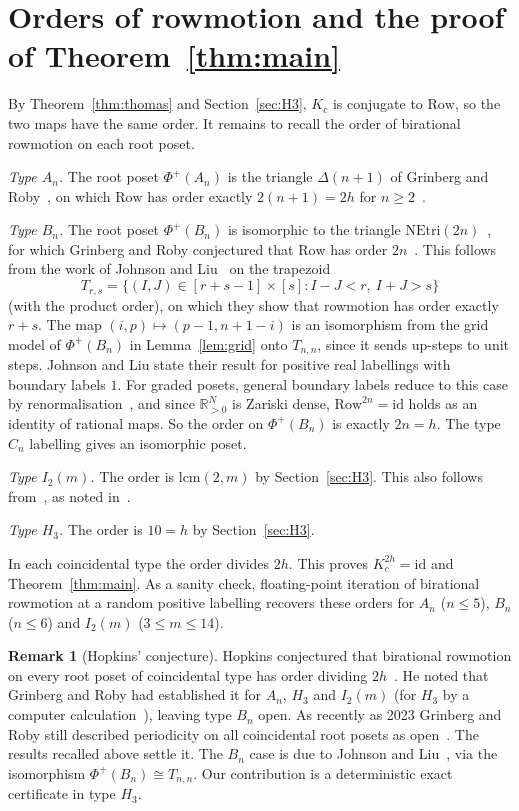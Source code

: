 \documentclass[11pt]{amsart}
\theoremstyle{definition}
\newtheorem{remark}[theorem]{Remark}
\newcommand{\Row}{\mathrm{Row}}
\begin{document}
\section{\texorpdfstring{Orders of rowmotion and the proof of Theorem~\ref{thm:main}}{Orders of rowmotion and the proof of the main theorem}}\label{sec:orders}
By Theorem~\ref{thm:thomas} and Section~\ref{sec:H3}, $K_c$ is conjugate to $\Row$, so the two maps have the same order. It remains to recall the order of birational rowmotion on each root poset.

\emph{Type $A_n$.} The root poset $\Phi^+(A_n)$ is the triangle $\Delta(n+1)$ of Grinberg and Roby~\cite[Rem.~18.3]{GR2}, on which $\Row$ has order exactly $2(n+1)=2h$ for $n\ge2$~\cite[Cor.~18.9]{GR2}.

\emph{Type $B_n$.} The root poset $\Phi^+(B_n)$ is isomorphic to the triangle $\mathrm{NEtri}(2n)$~\cite[Rem.~19.3]{GR2}, for which Grinberg and Roby conjectured that $\Row$ has order $2n$~\cite[Conj.~19.5]{GR2}. This follows from the work of Johnson and Liu~\cite[Cor.~5.3]{JL} on the trapezoid
\[T_{r,s}=\{(I,J)\in[r+s-1]\times[s]: I-J<r,\ I+J>s\}\]
(with the product order), on which they show that rowmotion has order exactly $r+s$. The map $(i,p)\mapsto(p-1,n+1-i)$ is an isomorphism from the grid model of $\Phi^+(B_n)$ in Lemma~\ref{lem:grid} onto $T_{n,n}$, since it sends up-steps to unit steps. Johnson and Liu state their result for positive real labellings with boundary labels $1$. For graded posets, general boundary labels reduce to this case by renormalisation~\cite{EP}, and since $\mathbb R_{>0}^N$ is Zariski dense, $\Row^{2n}=\mathrm{id}$ holds as an identity of rational maps. So the order on $\Phi^+(B_n)$ is exactly $2n=h$. The type $C_n$ labelling gives an isomorphic poset.

\emph{Type $I_2(m)$.} The order is $\mathrm{lcm}(2,m)$ by Section~\ref{sec:H3}. This also follows from~\cite[Prop.~7.3]{GR1}, as noted in~\cite[\S21]{GR1}.

\emph{Type $H_3$.} The order is $10=h$ by Section~\ref{sec:H3}.

In each coincidental type the order divides $2h$. This proves $K_c^{2h}=\mathrm{id}$ and Theorem~\ref{thm:main}. As a sanity check, floating-point iteration of birational rowmotion at a random positive labelling recovers these orders for $A_n$ ($n\le5$), $B_n$ ($n\le6$) and $I_2(m)$ ($3\le m\le14$).

\begin{remark}[Hopkins' conjecture]\label{rem:hopkins}
Hopkins conjectured that birational rowmotion on every root poset of coincidental type has order dividing $2h$~\cite[Conj.~4.40]{Hop}. He noted that Grinberg and Roby had established it for $A_n$, $H_3$ and $I_2(m)$ (for $H_3$ by a computer calculation~\cite[\S21]{GR1}), leaving type $B_n$ open. As recently as 2023 Grinberg and Roby still described periodicity on all coincidental root posets as open~\cite{GR3}. The results recalled above settle it. The $B_n$ case is due to Johnson and Liu~\cite{JL}, via the isomorphism $\Phi^+(B_n)\cong T_{n,n}$. Our contribution is a deterministic exact certificate in type $H_3$.
\end{remark}
\end{document}
